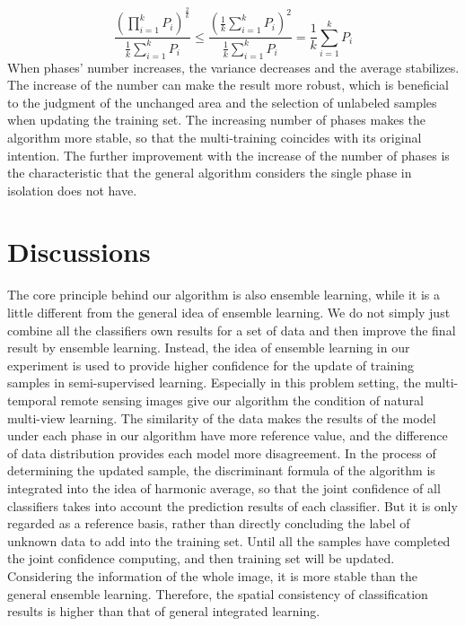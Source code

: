 \documentclass{isprs} %
\begin{document}
\begin{equation}
    \frac{(\prod\limits_{i=1}^kP_i)^{\frac{2}{k}}}{\frac{1}{k}\sum\limits_{i=1}^kP_i}\le \frac{(\frac{1}{k}\sum\limits_{i=1}^kP_i)^2}{\frac{1}{k}\sum\limits_{i=1}^kP_i}=\frac{1}{k}\sum\limits_{i=1}^kP_i
\end{equation}
When phases’ number increases, the variance decreases and the average stabilizes. The increase of the number can make the result more robust, which is beneficial to the judgment of the unchanged area and the selection of unlabeled samples when updating the training set. The increasing number of phases makes the algorithm more stable, so that the multi-training coincides with its original intention. The further improvement with the increase of the number of phases is the characteristic that the general algorithm considers the single phase in isolation does not have.

\section{Discussions}\label{sec:Discussions}

The core principle behind our algorithm is also ensemble learning, while it is a little different from the general idea of ensemble learning. We do not simply just combine all the classifiers own results for a set of data and then improve the final result by ensemble learning. Instead, the idea of ensemble learning in our experiment is used to provide higher confidence for the update of training samples in semi-supervised learning. Especially in this problem setting, the multi-temporal remote sensing images give our algorithm the condition of natural multi-view learning. The similarity of the data makes the results of the model under each phase in our algorithm have more reference value, and the difference of data distribution provides each model more disagreement. In the process of determining the updated sample, the discriminant formula of the algorithm is integrated into the idea of harmonic average, so that the joint confidence of all classifiers takes into account the prediction results of each classifier. But it is only regarded as a reference basis, rather than directly concluding the label of unknown data to add into the training set. Until all the samples have completed the joint confidence computing, and then training set will be updated. Considering the information of the whole image, it is more stable than the general ensemble learning. Therefore, the spatial consistency of classification results is higher than that of general integrated learning.
\end{document}
